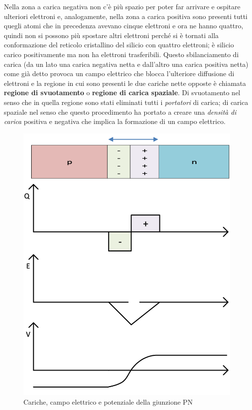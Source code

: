\documentclass[12pt, a4paper]{report}
\begin{document}
Nella zona a carica negativa non c'è più spazio per poter far arrivare e ospitare ulteriori elettroni e, analogamente, nella zona a carica positiva sono presenti tutti quegli atomi che in precedenza avevano cinque elettroni e ora ne hanno quattro, quindi non si possono più spostare altri elettroni perché si è tornati alla conformazione del reticolo cristallino del silicio con quattro elettroni; è silicio carico positivamente ma non ha elettroni trasferibili. Questo sbilanciamento di carica (da un lato una carica negativa netta e dall'altro una carica positiva netta) come già detto provoca un campo elettrico che blocca l'ulteriore diffusione di elettroni e la regione in cui sono presenti le due cariche nette opposte è chiamata \textbf{regione di svuotamento} o \textbf{regione di carica spaziale}. Di svuotamento nel senso che in quella regione sono stati eliminati tutti i \textit{portatori} di carica; di carica spaziale nel senso che questo procedimento ha portato a creare una \textit{densità di carica} positiva e negativa che implica la formazione di un campo elettrico.
\begin{figure}[h]
\centering
\includegraphics[scale=0.4,angle=0]{giunzione_pn_grafici.png}
\caption{Cariche, campo elettrico e potenziale della giunzione PN}
\label{grafici}
\end{figure}
\end{document}
